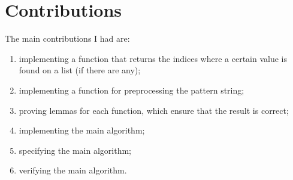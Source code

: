 \chapter*{Contributions} 

The main contributions I had are:
\begin{enumerate}
\item implementing a function that returns the indices where a certain value is found on a list (if there are any);
\item implementing a function for preprocessing the pattern string;
\item proving lemmas for each function, which ensure that the result is correct;
\item implementing the main algorithm;
\item specifying the main algorithm;
\item verifying the main algorithm.
\end{enumerate}